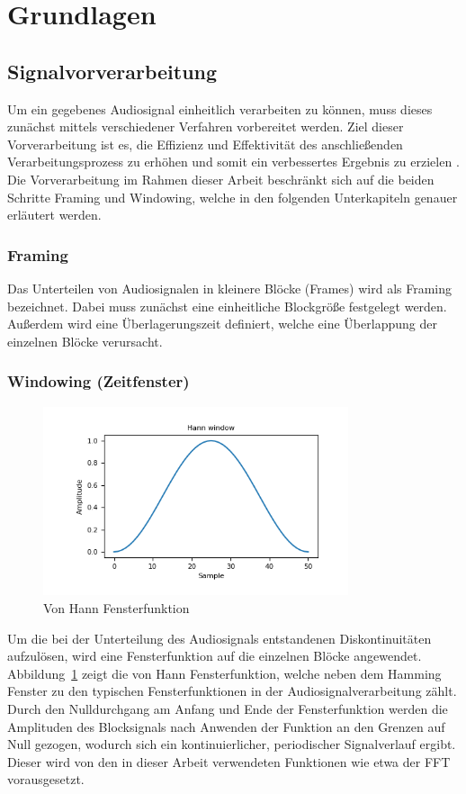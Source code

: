\section{Grundlagen}\label{sec:Grundlagen}
\subsection{Signalvorverarbeitung}
Um ein gegebenes Audiosignal einheitlich verarbeiten zu können, muss dieses zunächst mittels verschiedener Verfahren vorbereitet werden.
Ziel dieser Vorverarbeitung ist es, die Effizienz und Effektivität des anschließenden Verarbeitungsprozess zu erhöhen und somit ein verbessertes Ergebnis zu erzielen \autocite[vgl.][S. 11672]{lokesh_speech_2019}.
Die Vorverarbeitung im Rahmen dieser Arbeit beschränkt sich auf die beiden Schritte Framing und Windowing, welche in den folgenden Unterkapiteln genauer erläutert werden.

\subsubsection{Framing}
Das Unterteilen von Audiosignalen in kleinere Blöcke (Frames) wird als Framing bezeichnet.
Dabei muss zunächst eine einheitliche Blockgröße festgelegt werden.
Außerdem wird eine Überlagerungszeit definiert, welche eine Überlappung der einzelnen Blöcke verursacht.

\subsubsection{Windowing (Zeitfenster)}
\begin{figure}
  \centering
  \includegraphics[width=0.8\textwidth, keepaspectratio]{images/hann_window.png}
  \caption{Von Hann Fensterfunktion \autocite{noauthor_numpyhanning_nodate}}
  \label{fig:vonHannFenster}
\end{figure}
Um die bei der Unterteilung des Audiosignals entstandenen Diskontinuitäten aufzulösen, wird eine Fensterfunktion auf die einzelnen Blöcke angewendet.
Abbildung~\ref{fig:vonHannFenster} zeigt die von Hann Fensterfunktion, welche neben dem Hamming Fenster zu den typischen Fensterfunktionen in der Audiosignalverarbeitung zählt.
Durch den Nulldurchgang am Anfang und Ende der Fensterfunktion werden die Amplituden des Blocksignals nach Anwenden der Funktion an den Grenzen auf Null gezogen, wodurch sich ein kontinuierlicher, periodischer Signalverlauf ergibt.
Dieser wird von den in dieser Arbeit verwendeten Funktionen wie etwa der \ac{FFT} vorausgesetzt.

